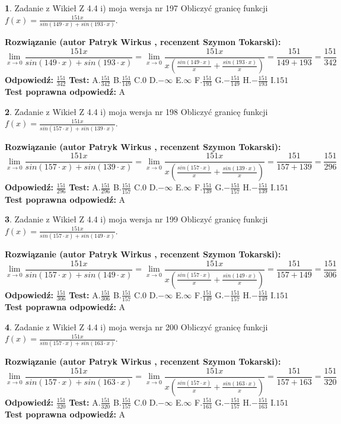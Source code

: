 \documentclass[12pt, a4paper]{article}
\theoremstyle{definition} %
\newtheorem{zad}{}
\newcommand{\zadStart}[1]{\begin{zad}#1\newline}
\newcommand{\zadStop}{\end{zad}}
\newcommand{\rozwStart}[2]{\noindent \textbf{Rozwiązanie (autor #1 , recenzent #2): }\newline}
\newcommand{\rozwStop}{\newline}
\newcommand{\odpStart}{\noindent \textbf{Odpowiedź:}\newline}
\newcommand{\odpStop}{\newline}
\newcommand{\testStart}{\noindent \textbf{Test:}\newline}
\newcommand{\testStop}{\newline}
\newcommand{\kluczStart}{\noindent \textbf{Test poprawna odpowiedź:}\newline}
\newcommand{\kluczStop}{\newline}
\begin{document}
\zadStart{Zadanie z Wikieł Z 4.4 i) moja wersja nr 197}
Obliczyć granicę funkcji $f(x)=\frac{151x}{sin(149\cdot x) +sin(193\cdot x)}$.
\zadStop
\rozwStart{Patryk Wirkus}{Szymon Tokarski}
$$\lim\limits_{x\to 0}\frac{151x}{sin(149\cdot x) +sin(193\cdot x)}=\lim\limits_{x\to 0}\frac{151x}{x(\frac{sin(149\cdot x)}{x}+\frac{sin(193\cdot x)}{x})}=\frac{151}{149+193} = \frac{151}{342}$$
\rozwStop
\odpStart
$\frac{151}{342}$
\odpStop
\testStart
A.$\frac{151}{342}$
B.$\frac{151}{149}$
C.$0$
D.$-\infty$
E.$\infty$
F.$\frac{151}{193}$
G.$-\frac{151}{149}$
H.$-\frac{151}{193}$
I.$151$
\testStop
\kluczStart
A
\kluczStop



\zadStart{Zadanie z Wikieł Z 4.4 i) moja wersja nr 198}
Obliczyć granicę funkcji $f(x)=\frac{151x}{sin(157\cdot x) +sin(139\cdot x)}$.
\zadStop
\rozwStart{Patryk Wirkus}{Szymon Tokarski}
$$\lim\limits_{x\to 0}\frac{151x}{sin(157\cdot x) +sin(139\cdot x)}=\lim\limits_{x\to 0}\frac{151x}{x(\frac{sin(157\cdot x)}{x}+\frac{sin(139\cdot x)}{x})}=\frac{151}{157+139} = \frac{151}{296}$$
\rozwStop
\odpStart
$\frac{151}{296}$
\odpStop
\testStart
A.$\frac{151}{296}$
B.$\frac{151}{157}$
C.$0$
D.$-\infty$
E.$\infty$
F.$\frac{151}{139}$
G.$-\frac{151}{157}$
H.$-\frac{151}{139}$
I.$151$
\testStop
\kluczStart
A
\kluczStop



\zadStart{Zadanie z Wikieł Z 4.4 i) moja wersja nr 199}
Obliczyć granicę funkcji $f(x)=\frac{151x}{sin(157\cdot x) +sin(149\cdot x)}$.
\zadStop
\rozwStart{Patryk Wirkus}{Szymon Tokarski}
$$\lim\limits_{x\to 0}\frac{151x}{sin(157\cdot x) +sin(149\cdot x)}=\lim\limits_{x\to 0}\frac{151x}{x(\frac{sin(157\cdot x)}{x}+\frac{sin(149\cdot x)}{x})}=\frac{151}{157+149} = \frac{151}{306}$$
\rozwStop
\odpStart
$\frac{151}{306}$
\odpStop
\testStart
A.$\frac{151}{306}$
B.$\frac{151}{157}$
C.$0$
D.$-\infty$
E.$\infty$
F.$\frac{151}{149}$
G.$-\frac{151}{157}$
H.$-\frac{151}{149}$
I.$151$
\testStop
\kluczStart
A
\kluczStop



\zadStart{Zadanie z Wikieł Z 4.4 i) moja wersja nr 200}
Obliczyć granicę funkcji $f(x)=\frac{151x}{sin(157\cdot x) +sin(163\cdot x)}$.
\zadStop
\rozwStart{Patryk Wirkus}{Szymon Tokarski}
$$\lim\limits_{x\to 0}\frac{151x}{sin(157\cdot x) +sin(163\cdot x)}=\lim\limits_{x\to 0}\frac{151x}{x(\frac{sin(157\cdot x)}{x}+\frac{sin(163\cdot x)}{x})}=\frac{151}{157+163} = \frac{151}{320}$$
\rozwStop
\odpStart
$\frac{151}{320}$
\odpStop
\testStart
A.$\frac{151}{320}$
B.$\frac{151}{157}$
C.$0$
D.$-\infty$
E.$\infty$
F.$\frac{151}{163}$
G.$-\frac{151}{157}$
H.$-\frac{151}{163}$
I.$151$
\testStop
\kluczStart
A
\kluczStop
\end{document}
